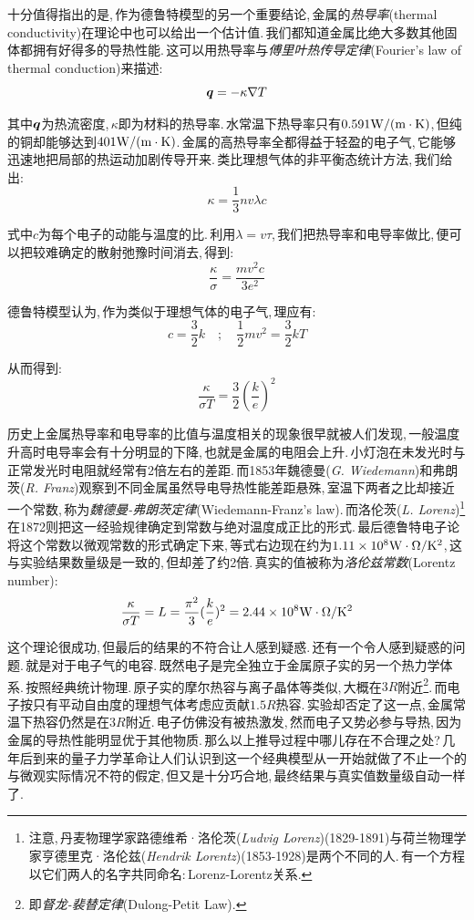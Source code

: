 十分值得指出的是,\,作为德鲁特模型的另一个重要结论,\,金属的\emph{热导率}(thermal conductivity)在理论中也可以给出一个估计值.\,我们都知道金属比绝大多数其他固体都拥有好得多的导热性能.\,这可以用热导率与\emph{傅里叶热传导定律}(Fourier's law of thermal conduction)来描述:
\[\boldsymbol{q}=-\kappa \nabla T\]

其中$\boldsymbol{q}$为热流密度,\,$\kappa$即为材料的热导率.\,水常温下热导率只有$0.591 \rm W/(m\cdot K)$,\,但纯的铜却能够达到$401 \rm W/(m\cdot K)$.\,金属的高热导率全都得益于轻盈的电子气,\,它能够迅速地把局部的热运动加剧传导开来.\,类比理想气体的非平衡态统计方法,\,我们给出:
\[\kappa=\frac{1}{3}nv\lambda c\]

式中$c$为每个电子的动能与温度的比.\,利用$\lambda=v\tau$,\,我们把热导率和电导率做比,\,便可以把较难确定的散射弛豫时间消去,\,得到:
\[\frac{\kappa}{\sigma}=\frac{mv^2c}{3e^2}\]

德鲁特模型认为,\,作为类似于理想气体的电子气,\,理应有:
\[c=\frac{3}{2}k\quad ;\quad \frac{1}{2}mv^2=\frac{3}{2}kT \]

从而得到:
\[\frac{\kappa}{\sigma T}=\frac{3}{2}(\frac{k}{e})^2\]

历史上金属热导率和电导率的比值与温度相关的现象很早就被人们发现,\,一般温度升高时电导率会有十分明显的下降,\,也就是金属的电阻会上升.\,小灯泡在未发光时与正常发光时电阻就经常有2倍左右的差距.\,而1853年魏德曼({\it G. Wiedemann})和弗朗茨({\it R. Franz})观察到不同金属虽然导电导热性能差距悬殊,\,室温下两者之比却接近一个常数,\,称为\emph{魏德曼-弗朗茨定律}(Wiedemann-Franz's law).\,而洛伦茨({\it L. Lorenz})\footnote{注意,\,丹麦物理学家路德维希·洛伦茨({\it Ludvig Lorenz})(1829-1891)与荷兰物理学家亨德里克·洛伦兹({\it Hendrik Lorentz})(1853-1928)是两个不同的人.\,有一个方程以它们两人的名字共同命名:\,Lorenz-Lorentz关系.}在1872则把这一经验规律确定到常数与绝对温度成正比的形式.\,最后德鲁特电子论将这个常数以微观常数的形式确定下来,\,等式右边现在约为$1.11\times 10^{8} \rm W \cdot\Omega /K^2$,\,这与实验结果数量级是一致的,\,但却差了约2倍.\,真实的值被称为\emph{洛伦兹常数}(Lorentz number):
\[\frac{\kappa}{\sigma T}=L=\frac{\pi^2}{3}(\frac{k}{e})^2=2.44\times 10^{8} \rm W \cdot\Omega /K^2\]

这个理论很成功,\,但最后的结果的不符合让人感到疑惑.\,还有一个令人感到疑惑的问题.\,就是对于电子气的电容.\,既然电子是完全独立于金属原子实的另一个热力学体系.\,按照经典统计物理.\,原子实的摩尔热容与离子晶体等类似,\,大概在$3R$附近\footnote{即\emph{督龙-裴替定律}(Dulong-Petit Law).}.\,而电子按只有平动自由度的理想气体考虑应贡献$1.5R$热容.\,实验却否定了这一点,\,金属常温下热容仍然是在$3R$附近.\,电子仿佛没有被热激发,\,然而电子又势必参与导热,\,因为金属的导热性能明显优于其他物质.\,那么以上推导过程中哪儿存在不合理之处?\,几年后到来的量子力学革命让人们认识到这一个经典模型从一开始就做了不止一个的与微观实际情况不符的假定,\,但又是十分巧合地,\,最终结果与真实值数量级自动一样了.

